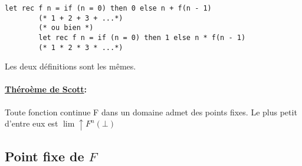 \documentclass[11pt,a4paper]{article}
\begin{document}

	\begin{lstlisting}[language=caml,caption=?]
		let rec f n = if (n = 0) then 0 else n + f(n - 1)
		(* 1 + 2 + 3 + ...*)
		(* ou bien *)
		let rec f n = if (n = 0) then 1 else n * f(n - 1)
		(* 1 * 2 * 3 * ...*)
	\end{lstlisting}
	
	Les deux définitions sont les mêmes.
	
	\paragraph{\underline{Théroème de Scott}:}
	
	Toute fonction continue F dans un domaine admet des points fixes. Le plus petit d'entre eux est $\lim \uparrow F^n(\bot)$
	
	\subsection{Point fixe de $F$}
	
\end{document}
